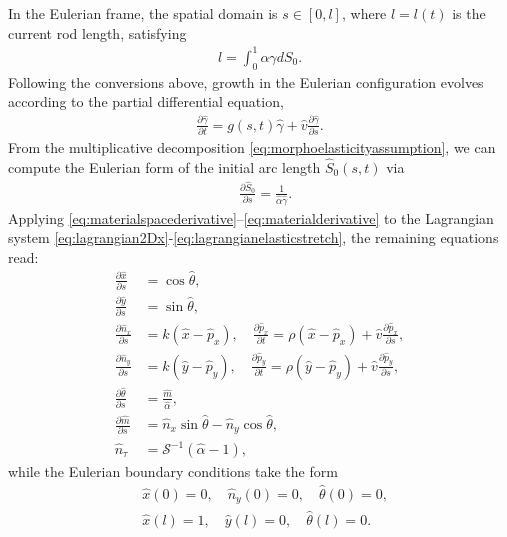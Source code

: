 In the Eulerian frame, the spatial domain is $s \in [0, l]$, where $l=l(t)$ is the current rod length, satisfying
\begin{align}
l= \int^{1}_0\alpha\gamma dS_0.\label{eq:totalrodlength}
\end{align}
Following the conversions above, growth in the Eulerian configuration evolves according to the partial differential equation,
\begin{align}
\frac{\partial\hat{\gamma}}{\partial t} = g(s,t)\hat{\gamma} + \hat{v}\frac{\partial\hat{\gamma}}{\partial s}.\label{eq:euleriangrowth}
\end{align}
From the multiplicative decomposition \eqref{eq:morphoelasticityassumption}, we can compute the Eulerian form of the initial arc length $\hat{S}_0(s, t)$ via
\begin{align}
&\frac{\partial \hat{S}_0}{\partial s} = \frac{1}{\hat{\alpha}\hat{\gamma}}.\label{eq:eulerianmorphoelasticityassumption}
\end{align}
Applying \eqref{eq:materialspacederivative}--\eqref{eq:materialderivative} to the Lagrangian system \eqref{eq:lagrangian2Dx}-\eqref{eq:lagrangianelasticstretch}, the remaining equations read:
\begin{align}
\frac{\partial \hat{x}}{\partial s} &= \cos\hat{\theta},\label{eq:eulerian2Dx}\\
\frac{\partial\hat{y}}{\partial s} &= \sin\hat{\theta},\label{eq:eulerian2Dy}\\
\frac{\partial \hat{n}_x}{\partial s} &= k(\hat{x} - \hat{p}_x), \quad \frac{\partial\hat{p}_x}{\partial t} = \rho(\hat{x} - \hat{p}_x) + \hat{v}\frac{\partial \hat{p}_x}{\partial s},\label{eq:eulerian2Dforcex}\\
\frac{\partial \hat{n}_y}{\partial s} &= k(\hat{y} - \hat{p}_y), \quad \frac{\partial \hat{p}_y}{\partial t} = \rho(\hat{y} - \hat{p}_y) + \hat{v}\frac{\partial \hat{p}_y}{\partial s},\label{eq:eulerian2Dforcey}\\
\frac{\partial \hat{\theta}}{\partial s} &= \frac{\hat{m}}{\hat{\alpha}},\label{eq:eulerian2Dtheta}\\
\frac{\partial \hat{m}}{\partial s} &= \hat{n}_x\sin\hat{\theta} - \hat{n}_y\cos\hat{\theta},\label{eq:eulerian2Dmoment}\\
\hat{n}_\tau &= \mathcal{S}^{-1}\left(\hat{\alpha} - 1\right),\label{eq:eulerianelasticstretch}
\end{align}
%
while the Eulerian boundary conditions take the form
\begin{align}
&\hat{x}(0) = 0, \quad \hat{n}_y(0) = 0, \quad \hat{\theta}(0) = 0,\nonumber\\
&\hat{x}(l) = 1, \quad \hat{y}(l) = 0, \quad \hat{\theta}(l) = 0.\label{eq:eulerianBCs}
\end{align}

